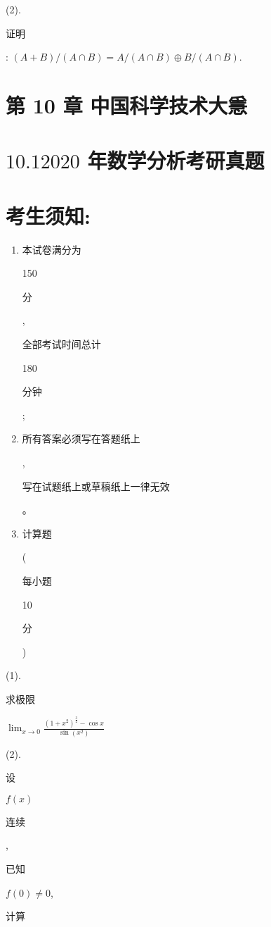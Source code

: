 \documentclass[10pt]{article}
\begin{document}
(2). \begin{CJK}{UTF8}{mj}证明\end{CJK}: $(A+B) /(A \cap B)=A /(A \cap B) \oplus B /(A \cap B)$.

\section{第 10 章 中国科学技术大㥯}
\section{$10.12020$ 年数学分析考研真题}
\section{考生须知:}
\begin{enumerate}
  \item \begin{CJK}{UTF8}{mj}本试卷满分为\end{CJK} 150 \begin{CJK}{UTF8}{mj}分\end{CJK}, \begin{CJK}{UTF8}{mj}全部考试时间总计\end{CJK} 180 \begin{CJK}{UTF8}{mj}分钟\end{CJK};

  \item \begin{CJK}{UTF8}{mj}所有答案必须写在答题纸上\end{CJK}, \begin{CJK}{UTF8}{mj}写在试题纸上或草稿纸上一律无效\end{CJK}。

  \item \begin{CJK}{UTF8}{mj}计算题\end{CJK} (\begin{CJK}{UTF8}{mj}每小题\end{CJK} 10 \begin{CJK}{UTF8}{mj}分\end{CJK})

\end{enumerate}
(1). \begin{CJK}{UTF8}{mj}求极限\end{CJK} $\lim _{x \rightarrow 0} \frac{\left(1+x^{2}\right)^{\frac{3}{2}}-\cos x}{\sin \left(x^{2}\right)}$

(2). \begin{CJK}{UTF8}{mj}设\end{CJK} $f(x)$ \begin{CJK}{UTF8}{mj}连续\end{CJK}, \begin{CJK}{UTF8}{mj}已知\end{CJK} $f(0) \neq 0$, \begin{CJK}{UTF8}{mj}计算\end{CJK}
\end{document}
